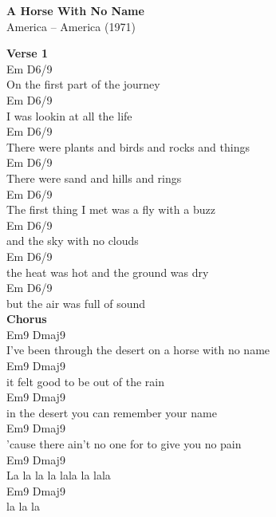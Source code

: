 \documentclass[a4paper]{article}
\begin{document}
    \begin{center}
        \textbf{A Horse With No Name}
        ~\\
        America -- America (1971)
    \end{center}
    {
        \footnotesize
        \textbf{Verse 1}
        ~\\
        {
            \cutive
            \obeyspaces
       Em                D6/9
\\
On the first part of the journey
\\
       Em                D6/9
\\
I was lookin at all the life
\\
            Em                 D6/9
\\
There were plants and birds and rocks and things
\\
            Em                D6/9
\\
There were sand and hills and rings
\\
       Em                  D6/9
\\
The first thing I met was a fly with a buzz
\\
         Em           D6/9
\\
and the sky with no clouds
\\
     Em                   D6/9
\\
the heat was hot and the ground was dry
\\
         Em              D6/9
\\
but the air was full of sound
\\

        }
        \textbf{Chorus}
        ~\\
        {
            \cutive
            \obeyspaces
      Em9                         Dmaj9
\\
I've been through the desert on a horse with no name
\\
        Em9                   Dmaj9
\\
it felt good to be out of the rain
\\
       Em9           Dmaj9
\\
in the desert you can remember your name
\\
              Em9                Dmaj9
\\
'cause there ain't no one for to give you no pain
\\
   Em9    Dmaj9
\\
La la   la la lala la lala   
\\
Em9    Dmaj9
\\
la la la 
\\

}}
\end{document}
